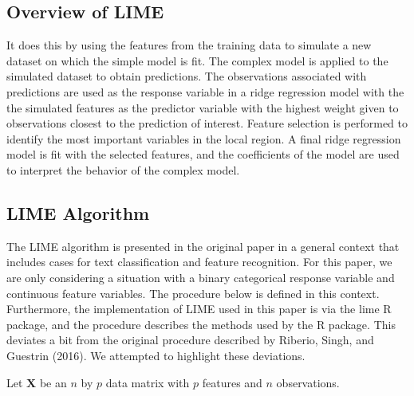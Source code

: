 \documentclass[AMS,STIX2COL]{WileyNJD-v2}
\begin{document}
\subsection{Overview of LIME}

It does this by using the features from the training data to simulate a new dataset on which the simple model is fit. The complex model is applied to the simulated dataset to obtain predictions. The observations associated with predictions are used as the response variable in a ridge regression model with the the simulated features as the predictor variable with the highest weight given to observations closest to the prediction of interest. Feature selection is performed to identify the most important variables in the local region. A final ridge regression model is fit with the selected features, and the coefficients of the model are used to interpret the behavior of the complex model.

\subsection{LIME Algorithm}

The LIME algorithm is presented in the original paper in a general context that includes cases for text classification and feature recognition. For this paper, we are only considering a situation with a binary categorical response variable and continuous feature variables. The procedure below is defined in this context. Furthermore, the implementation of LIME used in this paper is via the lime R package, and the procedure describes the methods used by the R package. This deviates a bit from the original procedure described by Riberio, Singh, and Guestrin (2016). We attempted to highlight these deviations.

Let $\textbf{X}$ be an $n$ by $p$ data matrix with $p$ features and $n$ observations.
\end{document}
